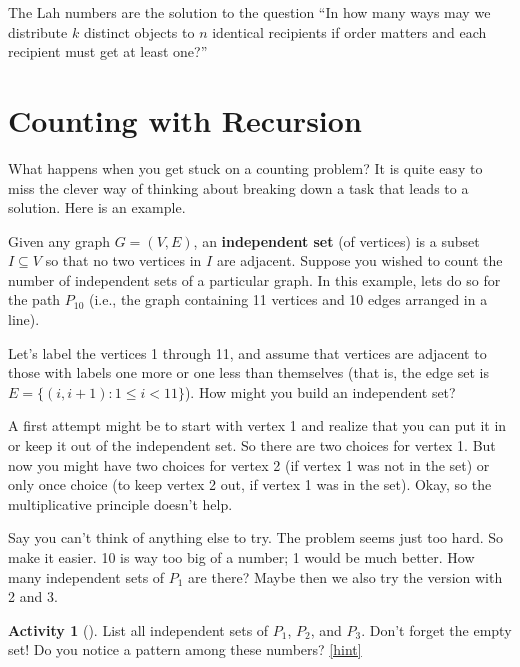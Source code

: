 \documentclass[10pt,]{book}
\newcommand{\terminology}[1]{\textbf{#1}}
\theoremstyle{plain}
\theoremstyle{definition}
\theoremstyle{definition}
\theoremstyle{definition}
\newtheorem{activity}[project]{Activity}
\numberwithin{equation}{chapter}
\def\st{:}
\newcommand{\lt}{<}
\begin{document}
\par
\hypertarget{p-878}{}%
The Lah numbers are the solution to the question ``In how many ways may we distribute \(k\) distinct objects to \(n\) identical recipients if order matters and each recipient must get at least one?''%
\typeout{************************************************}
\typeout{************************************************}
\section[{Counting with Recursion}]{Counting with Recursion}\label{sec_basic-recursion}
\hypertarget{p-879}{}%
What happens when you get stuck on a counting problem?  It is quite easy to miss the clever way of thinking about breaking down a task that leads to a solution.  Here is an example.%
\par
\hypertarget{p-880}{}%
Given any graph \(G = (V, E)\), an \terminology{independent set} (of vertices) is a subset \(I \subseteq V\) so that no two vertices in \(I\) are adjacent.  Suppose you wished to count the number of independent sets of a particular graph.  In this example, lets do so for the path \(P_{10}\) (i.e., the graph containing 11 vertices and 10 edges arranged in a line).%
\par
\hypertarget{p-881}{}%
Let's label the vertices 1 through 11, and assume that vertices are adjacent to those with labels one more or one less than themselves (that is, the edge set is \(E = \{(i,i+1) \st 1 \le i \lt 11\}\)).  How might you build an independent set?%
\par
\hypertarget{p-882}{}%
A first attempt might be to start with vertex 1 and realize that you can put it in or keep it out of the independent set.  So there are two choices for vertex 1.  But now you might have two choices for vertex 2 (if vertex 1 was not in the set) or only once choice (to keep vertex 2 out, if vertex 1 was in the set).  Okay, so the multiplicative principle doesn't help.%
\par
\hypertarget{p-883}{}%
Say you can't think of anything else to try.  The problem seems just too hard.  So make it easier.  10 is way too big of a number; 1 would be much better.  How many independent sets of \(P_1\) are there?  Maybe then we also try the version with 2 and 3.%
\begin{activity}[]\label{activity-125}
\hypertarget{p-884}{}%
List all independent sets of \(P_1\), \(P_2\), and \(P_3\).  Don't forget the empty set! Do you notice a pattern among these numbers?%
\hfill{\tiny\hyperlink{a-132}{[hint]}\hypertarget{q-132}{}}\end{activity}
\end{document}
